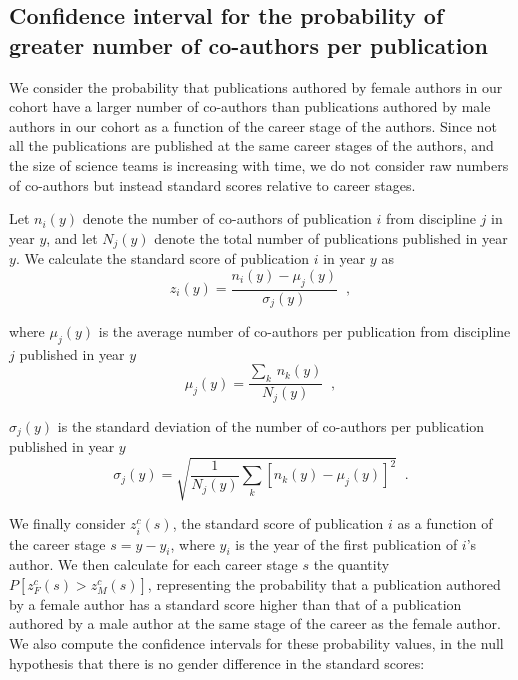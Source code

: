 \subsection{Confidence interval for the probability of greater number of co-authors per publication}

We consider the probability that publications authored by female authors in our cohort have a larger number of co-authors than publications authored by male authors in our cohort as a function of the career stage of the authors. Since not all the publications are published at the same career stages of the authors, and the size of science teams is increasing with time, we do not consider raw numbers of co-authors but instead standard scores relative to career stages.

Let $n_i(y)$ denote the number of co-authors of publication $i$ from discipline $j$ in year $y$, and let $N_j(y)$ denote the total number of publications published in year $y$. We calculate the standard score of publication $i$ in year $y$ as
\begin{equation}
z_i(y)=\frac{n_i(y)-\mu_j(y)}{\sigma_j (y)}\;\;,
\end{equation}

\noindent
where $\mu_j(y)$ is the average number of co-authors per publication from discipline $j$ published in year $y$
\begin{equation}
\mu_j(y)=\frac{\sum\limits_k \, n_k(y)}{N_j(y)}\;\;,
\end{equation}

\noindent
$\sigma_j(y)$ is the standard deviation of the number of co-authors per publication published in year $y$
\begin{equation}
\sigma_j(y)=\sqrt{\frac{1}{N_j(y)}\sum\limits_k \left[n_k(y) - \mu_j(y)\right]^2} \;\;.
\end{equation}

We finally consider $z_i^c(s)$, the standard score of publication $i$ as a function of the career stage $s=y-y_i$, where $y_i$ is the year of the first publication of $i$'s author. We then calculate for each career stage $s$ the quantity $P\left[z_F^c(s) > z_M^c(s) \right]$, representing the probability that a publication authored by a female author has a standard score higher than that of a publication authored by a male author at the same stage of the career as the female author. We also compute the confidence intervals for these probability values, in the null hypothesis that there is no gender difference in the standard scores:

